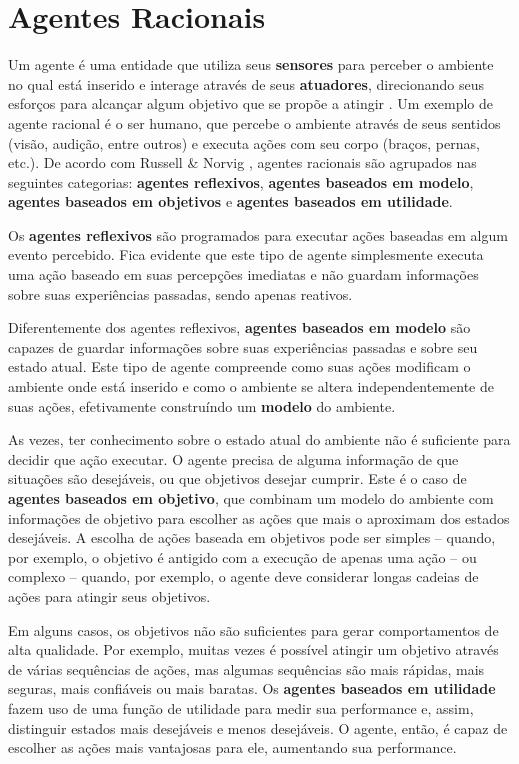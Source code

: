 \section{\label{section:agents}Agentes Racionais}
Um agente é uma entidade que utiliza seus \textbf{sensores} para perceber o
ambiente no qual está inserido e interage através de seus \textbf{atuadores},
direcionando seus esforços para alcançar algum objetivo que se propõe a atingir
\cite[cap. 2]{RussellNorvig200912}. Um exemplo de agente racional é o ser
humano, que percebe o ambiente através de seus sentidos (visão, audição, entre
outros) e executa ações com seu corpo (braços, pernas, etc.). De acordo com
Russell \& Norvig \cite{RussellNorvig200912}, agentes racionais são agrupados
nas seguintes categorias: \textbf{agentes reflexivos}, \textbf{agentes baseados
em modelo}, \textbf{agentes baseados em objetivos} e \textbf{agentes baseados em
utilidade}.

Os \textbf{agentes reflexivos} são programados para executar ações baseadas em
algum evento percebido. Fica evidente que este tipo de agente simplesmente
executa uma ação baseado em suas percepções imediatas e não guardam informações
sobre suas experiências passadas, sendo apenas reativos.

Diferentemente dos agentes reflexivos, \textbf{agentes baseados em modelo} são
capazes de guardar informações sobre suas experiências passadas e sobre seu
estado atual. Este tipo de agente compreende como suas ações modificam o
ambiente onde está inserido e como o ambiente se altera independentemente de
suas ações, efetivamente construíndo um \textbf{modelo} do ambiente. 

As vezes, ter conhecimento sobre o estado atual do ambiente não é suficiente
para decidir que ação executar. O agente precisa de alguma informação de que
situações são desejáveis, ou que objetivos desejar cumprir. Este é o caso de
\textbf{agentes baseados em objetivo}, que combinam um modelo do ambiente com
informações de objetivo para escolher as ações que mais o aproximam dos estados
desejáveis. A escolha de ações baseada em objetivos pode ser simples -- quando,
por exemplo, o objetivo é antigido com a execução de apenas uma ação -- ou
complexo -- quando, por exemplo, o agente deve considerar longas cadeias de
ações para atingir seus objetivos.

Em alguns casos, os objetivos não são suficientes para gerar comportamentos de
alta qualidade. Por exemplo, muitas vezes é possível atingir um objetivo através
de várias sequências de ações, mas algumas sequências são mais rápidas, mais
seguras, mais confiáveis ou mais baratas. Os \textbf{agentes baseados em
utilidade} fazem uso de uma função de utilidade para medir sua performance e,
assim, distinguir estados mais desejáveis e menos desejáveis. O agente, então, é
capaz de escolher as ações mais vantajosas para ele, aumentando sua performance.



